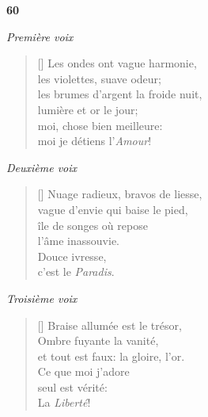 \documentclass[a4paper,12pt]{book}
\begin{document}

\bigskip

\begin{center}
  \textbf{60}
\end{center}

\settowidth{\versewidth}{XXXXXXXXXXXXXXXXXXXXXXXXXXXXXXXXXXXX}

\smallskip

\begin{center} \emph{Première voix} \end{center}

\begin{verse}[\versewidth]
  Les ondes ont vague harmonie, \\
  les violettes, suave odeur; \\
  les brumes d'argent la froide nuit, \\
  lumière et or le jour; \\
  moi, chose bien meilleure: \\
  moi je détiens l'\emph{Amour}!
\end{verse}

\smallskip

\begin{center} \emph{Deuxième voix} \end{center}

\begin{verse}[\versewidth]
  Nuage radieux, bravos de liesse, \\
  vague d'envie qui baise le pied, \\
  île de songes où repose \\
  l'âme inassouvie. \\
  Douce ivresse, \\
  c'est le \emph{Paradis}.
\end{verse}

\begin{center} \emph{Troisième voix} \end{center}

\begin{verse}[\versewidth]
  Braise allumée est le trésor, \\
  Ombre fuyante la vanité, \\
  et tout est faux: la gloire, l'or. \\
  Ce que moi j'adore \\
  seul est vérité: \\
  La \emph{Liberté}!
\end{verse}
\end{document}
